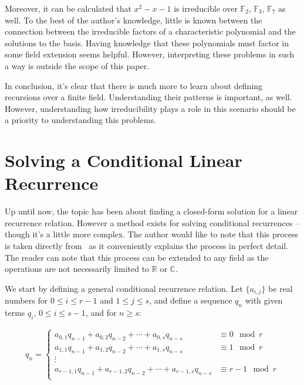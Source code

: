 \documentclass[a4paper]{article}
\theoremstyle{definition}
\begin{document}
Moreover, it can be calculated that $x^2-x-1$ is irreducible over $\mathbb{F}_2$, $\mathbb{F}_3$,
$\mathbb{F}_7$ as well. To the best of the author's knowledge, little is known between the connection
between the irreducible factors of a characteristic polynomial and the solutions to the basis. Having
knowledge that these polynomials must factor in some field extension seems helpful. However,
interpreting these problems in such a way is outside the scope of this paper.

In conclusion, it's clear that there is much more to learn about defining recursions over a finite
field. Understanding their patterns is important, as well. However, understanding how irreducibility
plays a role in this scenario should be a priority to understanding this problems.

\section{Solving a Conditional Linear Recurrence}

Up until now, the topic has been about finding a closed-form solution for a linear recurrence relation.
However a method exists for solving conditional recurrences -- though it's a little more complex. The
author would like to note that this process is taken directly from~\cite{bib:gen_cond_rec} as it
conveniently explains the process in perfect detail. The reader can note that this process can be
extended to any field as the operations are not necessarily limited to $\mathbb{R}$ or $\mathbb{C}$.

We start by defining a general conditional recurrence relation. Let $\{a_{i,j}\}$ be real numbers for
$0 \le i \le r-1$ and $1 \le j \le s$, and define a sequence ${q_n}$ with given terms $q_i$,
$0 \le i \le s-1$, and for $n \ge s$:

\begin{align*}
q_n=
\begin{cases}
a_{0,1}q_{n-1}+a_{0,2}q_{n-2}+\cdots+a_{0,s}q_{n-s}       & \equiv 0   \mod r \\
a_{1,1}q_{n-1}+a_{1,2}q_{n-2}+\cdots+a_{1,s}q_{n-s}       & \equiv 1   \mod r \\
\vdots                                                                        \\
a_{r-1,1}q_{n-1}+a_{r-1,2}q_{n-2}+\cdots+a_{r-1,s}q_{n-s} & \equiv r-1 \mod r \\
\end{cases}
\end{align*}
\end{document}
